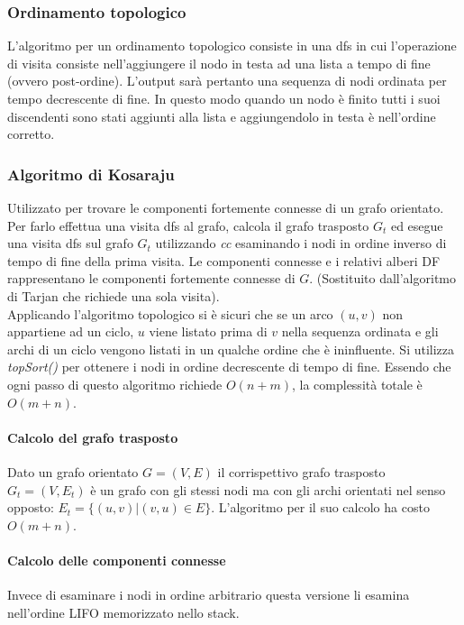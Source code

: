 \subsubsection{Ordinamento topologico}
L'algoritmo per un ordinamento topologico consiste in una dfs in cui l'operazione di visita consiste nell'aggiungere il nodo in testa ad una lista a tempo
di fine (ovvero post-ordine). L'output sar\`a pertanto una sequenza di nodi ordinata per tempo decrescente di fine. In questo modo quando un nodo \`e finito
tutti i suoi discendenti sono stati aggiunti alla lista e aggiungendolo in testa \`e nell'ordine corretto. \\


\subsubsection{Algoritmo di Kosaraju}
Utilizzato per trovare le componenti fortemente connesse di un grafo orientato. Per farlo effettua una visita dfs al grafo, calcola il grafo trasposto $G_t$
ed esegue una visita dfs sul grafo $G_t$ utilizzando \emph{cc} esaminando i nodi in ordine inverso di tempo di fine della prima visita. Le componenti 
connesse e i relativi alberi DF rappresentano le componenti fortemente connesse di $G$. (Sostituito dall'algoritmo di Tarjan che richiede una sola visita).\\

Applicando l'algoritmo topologico si \`e sicuri che se un arco $(u, v)$ non appartiene ad un ciclo, $u$ viene listato prima di $v$ nella sequenza ordinata e
gli archi di un ciclo vengono listati in un qualche ordine che \`e ininfluente. Si utilizza \emph{topSort()} per ottenere i nodi in ordine decrescente di 
tempo di fine. Essendo che ogni passo di questo algoritmo richiede $O(n+m)$, la complessit\`a totale \`e $O(m+n)$.
\paragraph{Calcolo del grafo trasposto}
Dato un grafo orientato $G=(V, E)$ il corrispettivo grafo trasposto $G_t=(V, E_t)$ \`e un grafo con gli stessi nodi ma con gli archi orientati nel senso 
opposto: $E_t=\{(u, v)|(v, u)\in E\}$. L'algoritmo per il suo calcolo ha costo $O(m+n)$.

\newpage
\paragraph{Calcolo delle componenti connesse}
Invece di esaminare i nodi in ordine arbitrario questa versione li esamina nell'ordine LIFO memorizzato nello stack.
\begin{multicols}{2}

\columnbreak

\end{multicols}
